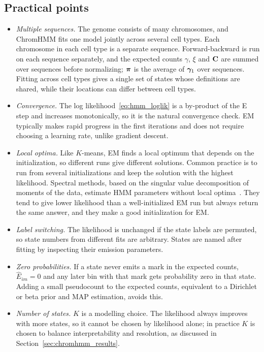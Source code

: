 \subsection{Practical points}

\begin{itemize}
  \item \emph{Multiple sequences.} The genome consists of many chromosomes, and ChromHMM fits one model jointly across several cell types. Each chromosome in each cell type is a separate sequence. Forward-backward is run on each sequence separately, and the expected counts $\gamma$, $\xi$ and $\mathbf{C}$ are summed over sequences before normalizing; $\boldsymbol{\pi}$ is the average of $\boldsymbol{\gamma}_1$ over sequences. Fitting across cell types gives a single set of states whose definitions are shared, while their locations can differ between cell types.
  \item \emph{Convergence.} The log likelihood~\eqref{eq:hmm_loglik} is a by-product of the E step and increases monotonically, so it is the natural convergence check. EM typically makes rapid progress in the first iterations and does not require choosing a learning rate, unlike gradient descent.
  \item \emph{Local optima.} Like $K$-means, EM finds a local optimum that depends on the initialization, so different runs give different solutions. Common practice is to run from several initializations and keep the solution with the highest likelihood. Spectral methods, based on the singular value decomposition of moments of the data, estimate HMM parameters without local optima~\citep{hsu2012}. They tend to give lower likelihood than a well-initialized EM run but always return the same answer, and they make a good initialization for EM.
  \item \emph{Label switching.} The likelihood is unchanged if the state labels are permuted, so state numbers from different fits are arbitrary. States are named after fitting by inspecting their emission parameters.
  \item \emph{Zero probabilities.} If a state never emits a mark in the expected counts, $\hat E_{im}=0$ and any later bin with that mark gets probability zero in that state. Adding a small pseudocount to the expected counts, equivalent to a Dirichlet or beta prior and MAP estimation, avoids this.
  \item \emph{Number of states.} $K$ is a modelling choice. The likelihood always improves with more states, so it cannot be chosen by likelihood alone; in practice $K$ is chosen to balance interpretability and resolution, as discussed in Section~\ref{sec:chromhmm_results}.
\end{itemize}

